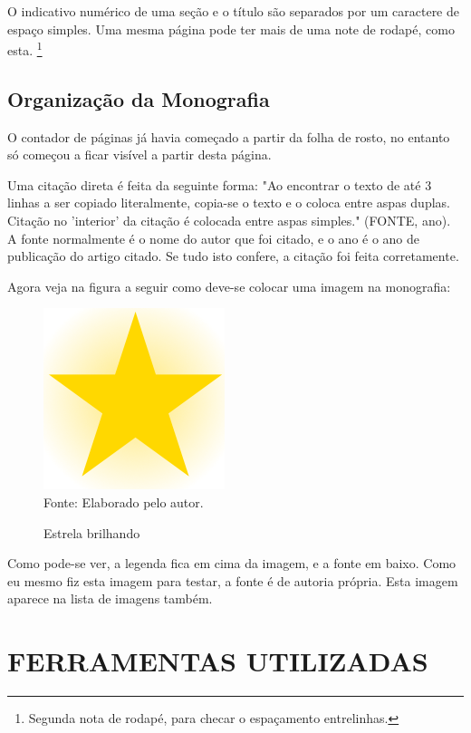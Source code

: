 \documentclass[12pt,a4paper]{article}
\newcommand{\source}[1]{Fonte: {#1}}
\begin{document}
	O indicativo numérico de uma seção e o título são separados por um caractere de espaço simples.
	Uma mesma página pode ter mais de uma note de rodapé, como esta.
	\footnote{Segunda nota de rodapé, para checar o espaçamento entrelinhas.}
	
	\subsection{Organização da Monografia}
	O contador de páginas já havia começado a partir da folha de rosto, no entanto só começou a ficar visível a partir desta página.	
	
	Uma citação direta é feita da seguinte forma:
	"Ao encontrar o texto de até 3 linhas a ser copiado literalmente, copia-se o texto e o coloca entre aspas duplas. Citação no 'interior' da citação é colocada entre aspas simples." (FONTE, ano).
	A fonte normalmente é o nome do autor que foi citado, e o ano é o ano de publicação do artigo citado.
	Se tudo isto confere, a citação foi feita corretamente.
	
	Agora veja na figura a seguir como deve-se colocar uma imagem na monografia:
	
\begin{figure}[ht!]
	\label{estrela}
	\caption{Estrela brilhando}
	\centering
	\vspace{3mm}
	\includegraphics[scale=0.5]{Star.png}\\
	\vspace{3mm}
	\source{Elaborado pelo autor.}
\end{figure}

	Como pode-se ver, a legenda fica em cima da imagem, e a fonte em baixo.
	Como eu mesmo fiz esta imagem para testar, a fonte é de autoria própria.
	Esta imagem aparece na lista de imagens também.

\clearpage %
\section{FERRAMENTAS UTILIZADAS}
\end{document}
